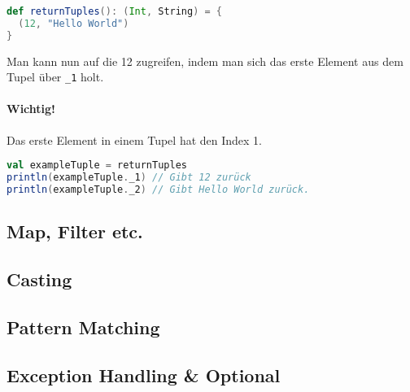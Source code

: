 \begin{lstlisting}[language=Scala, numbers=none]
def returnTuples(): (Int, String) = {
  (12, "Hello World")
}
\end{lstlisting}

Man kann nun auf die 12 zugreifen, indem man sich das erste Element aus dem Tupel über \texttt{\_1} holt.
\paragraph{Wichtig!}Das erste Element in einem Tupel hat den Index 1.

\begin{lstlisting}[language=Scala, numbers=none, caption=Zugriff auf die Elemente eines Tupels]
val exampleTuple = returnTuples
println(exampleTuple._1) // Gibt 12 zurück
println(exampleTuple._2) // Gibt Hello World zurück.
\end{lstlisting}

\subsection{Map, Filter etc.}
\subsection{Casting}
\subsection{Pattern Matching}
\subsection{Exception Handling \& Optional}
